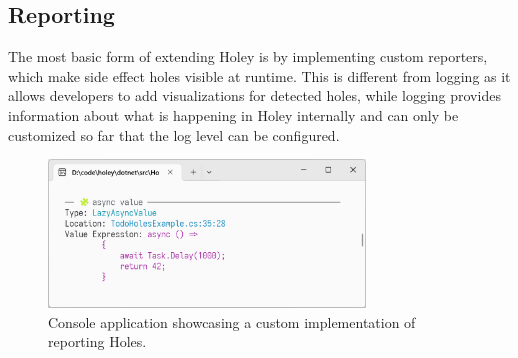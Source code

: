 \subsection{Reporting}
\label{sec:reporting}
The most basic form of extending Holey is by implementing custom reporters, which make side effect holes visible at runtime.
This is different from logging as it allows developers to add visualizations for detected holes, while logging provides information about what is happening in Holey internally and can only be customized so far that the log level can be configured.

\begin{figure}[ht]
    \centering
    \includegraphics[width=0.75\textwidth]{images/cli-reporting}
    \caption{Console application showcasing a custom implementation of reporting Holes.}
    \label{fig:holey-cli-reporting}
\end{figure}

